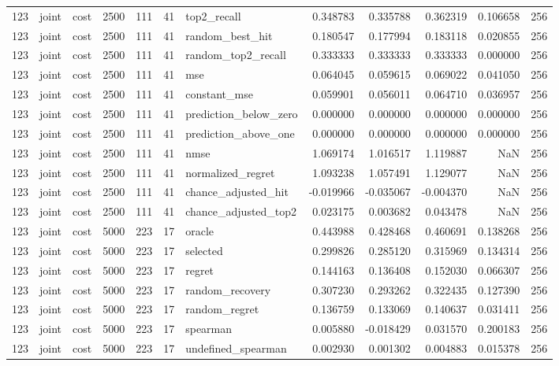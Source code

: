 \begin{tabular}{rllrrrlrrrrr}
123 & joint & cost & 2500 & 111 & 41 & top2_recall & 0.348783 & 0.335788 & 0.362319 & 0.106658 & 256 \\
123 & joint & cost & 2500 & 111 & 41 & random_best_hit & 0.180547 & 0.177994 & 0.183118 & 0.020855 & 256 \\
123 & joint & cost & 2500 & 111 & 41 & random_top2_recall & 0.333333 & 0.333333 & 0.333333 & 0.000000 & 256 \\
123 & joint & cost & 2500 & 111 & 41 & mse & 0.064045 & 0.059615 & 0.069022 & 0.041050 & 256 \\
123 & joint & cost & 2500 & 111 & 41 & constant_mse & 0.059901 & 0.056011 & 0.064710 & 0.036957 & 256 \\
123 & joint & cost & 2500 & 111 & 41 & prediction_below_zero & 0.000000 & 0.000000 & 0.000000 & 0.000000 & 256 \\
123 & joint & cost & 2500 & 111 & 41 & prediction_above_one & 0.000000 & 0.000000 & 0.000000 & 0.000000 & 256 \\
123 & joint & cost & 2500 & 111 & 41 & nmse & 1.069174 & 1.016517 & 1.119887 & NaN & 256 \\
123 & joint & cost & 2500 & 111 & 41 & normalized_regret & 1.093238 & 1.057491 & 1.129077 & NaN & 256 \\
123 & joint & cost & 2500 & 111 & 41 & chance_adjusted_hit & -0.019966 & -0.035067 & -0.004370 & NaN & 256 \\
123 & joint & cost & 2500 & 111 & 41 & chance_adjusted_top2 & 0.023175 & 0.003682 & 0.043478 & NaN & 256 \\
123 & joint & cost & 5000 & 223 & 17 & oracle & 0.443988 & 0.428468 & 0.460691 & 0.138268 & 256 \\
123 & joint & cost & 5000 & 223 & 17 & selected & 0.299826 & 0.285120 & 0.315969 & 0.134314 & 256 \\
123 & joint & cost & 5000 & 223 & 17 & regret & 0.144163 & 0.136408 & 0.152030 & 0.066307 & 256 \\
123 & joint & cost & 5000 & 223 & 17 & random_recovery & 0.307230 & 0.293262 & 0.322435 & 0.127390 & 256 \\
123 & joint & cost & 5000 & 223 & 17 & random_regret & 0.136759 & 0.133069 & 0.140637 & 0.031411 & 256 \\
123 & joint & cost & 5000 & 223 & 17 & spearman & 0.005880 & -0.018429 & 0.031570 & 0.200183 & 256 \\
123 & joint & cost & 5000 & 223 & 17 & undefined_spearman & 0.002930 & 0.001302 & 0.004883 & 0.015378 & 256 \\

\end{tabular}
